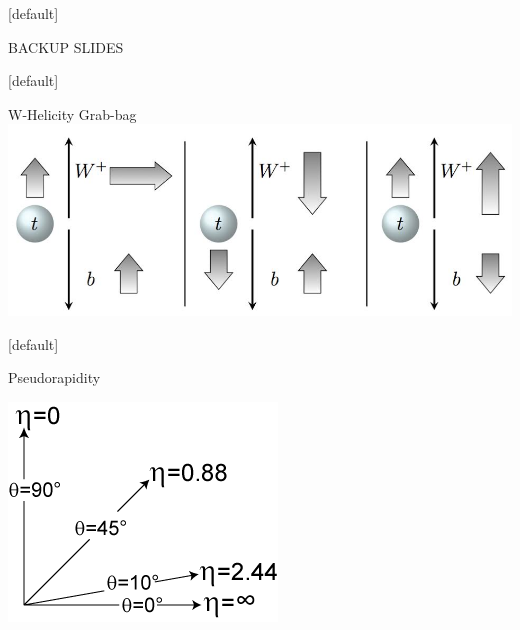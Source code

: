 \documentclass{beamer}
\begin{document}
{ %
  \makeatletter %
  [default] %
  \def\beamer@entrycode{\vspace*{-1.075\headheight}} %
  \makeatother
  
  \begin{frame}
    \vspace{40pt}
    \begin{center}
      \huge
      BACKUP SLIDES
    \end{center}
  \end{frame}

  \makeatletter %
  [default]
  \def\beamer@entrycode{\vspace*{-1.075\headheight}}
  \begin{frame} {W-Helicity Grab-bag}
    \includegraphics[width=\textwidth]{figures/helicity}
  \end{frame}

  \makeatletter %
  [default]
  \def\beamer@entrycode{\vspace*{-1.075\headheight}}
  \begin{frame} {Pseudorapidity}
    \begin{center}
      \includegraphics[width=.8\textwidth]{figures/Pseudorapidity2}
    \end{center}
  \end{frame}

}
\end{document}
